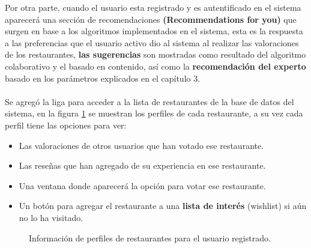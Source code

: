 \documentclass[12pt,letterpaper,oneside] {memoir}
\begin{document}
Por otra parte, cuando el usuario esta registrado y es autentificado en el sistema aparecerá una sección de recomendaciones \textbf{(Recommendations for you)} que surgen en base a los algoritmos implementados en el sistema, esta es la respuesta a las preferencias que el usuario activo dio al sistema al realizar las valoraciones de los restaurantes, \textbf{las sugerencias} son mostradas como resultado del algoritmo colaborativo y el basado en contenido, así como la \textbf{recomendación del experto} basado en los parámetros explicados en el capítulo 3.
\paragraph{}
Se agregó la liga para acceder a la lista de restaurantes de la base de datos del sistema, en la figura \ref{fig:p4} se muestran los perfiles de cada restaurante, a su vez cada perfil tiene las opciones para  ver:
\begin{itemize}
\item Las valoraciones de otros usuarios que han votado ese restaurante.
\item Las reseñas que han agregado de su experiencia en ese restaurante.
\item Una ventana donde aparecerá la opción para votar ese restaurante.
\item Un botón para agregar el restaurante a una \textbf{lista de interés} (wishlist) si aún no lo ha visitado.
\end{itemize}

\begin{figure}[H]
\centering 
{} \caption{Información de perfiles de restaurantes para el usuario registrado.} 
\label{fig:p4} 
\end{figure}
\end{document}
